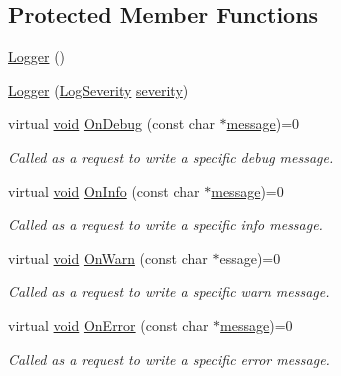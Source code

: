 \subsection*{Protected Member Functions}
\begin{DoxyCompactItemize}
\item 
\hyperlink{class_assimp_1_1_logger_a784e6d1a741072b17bab32a6a41055e8}{Logger} ()
\item 
\hyperlink{class_assimp_1_1_logger_accc0ffea63ddf0982d8c2ba7e07f0716}{Logger} (\hyperlink{class_assimp_1_1_logger_a8b6248a0fd062431e8572556350d29e6}{Log\-Severity} \hyperlink{glew_8h_acc39d4387d4f2d172de77ed0c5208990}{severity})
\item 
virtual \hyperlink{wglew_8h_aeea6e3dfae3acf232096f57d2d57f084}{void} \hyperlink{class_assimp_1_1_logger_aded6996d20f14204877097b88bd5eac6}{On\-Debug} (const char $\ast$\hyperlink{glew_8h_a76333d9470ffdd4811326932394d36da}{message})=0
\begin{DoxyCompactList}\small\item\em Called as a request to write a specific debug message. \end{DoxyCompactList}\item 
virtual \hyperlink{wglew_8h_aeea6e3dfae3acf232096f57d2d57f084}{void} \hyperlink{class_assimp_1_1_logger_aba81c4562ff8db83f06c6b62f2eb7983}{On\-Info} (const char $\ast$\hyperlink{glew_8h_a76333d9470ffdd4811326932394d36da}{message})=0
\begin{DoxyCompactList}\small\item\em Called as a request to write a specific info message. \end{DoxyCompactList}\item 
virtual \hyperlink{wglew_8h_aeea6e3dfae3acf232096f57d2d57f084}{void} \hyperlink{class_assimp_1_1_logger_ab8066978dd37992f711d75d49cf4607b}{On\-Warn} (const char $\ast$essage)=0
\begin{DoxyCompactList}\small\item\em Called as a request to write a specific warn message. \end{DoxyCompactList}\item 
virtual \hyperlink{wglew_8h_aeea6e3dfae3acf232096f57d2d57f084}{void} \hyperlink{class_assimp_1_1_logger_ae2ea0790aba6125b90af0f2768b0759d}{On\-Error} (const char $\ast$\hyperlink{glew_8h_a76333d9470ffdd4811326932394d36da}{message})=0
\begin{DoxyCompactList}\small\item\em Called as a request to write a specific error message. \end{DoxyCompactList}\end{DoxyCompactItemize}
